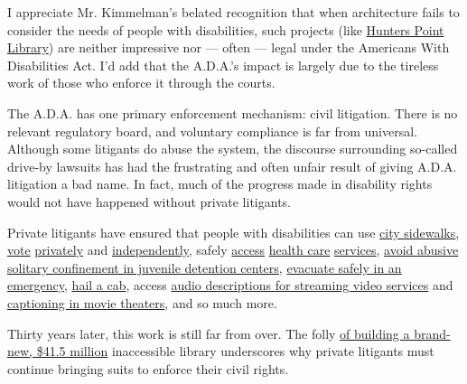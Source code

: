 I appreciate Mr. Kimmelman's belated recognition that when architecture
fails to consider the needs of people with disabilities, such projects
(like
\href{https://gothamist.com/news/new-41-million-hunters-point-library-has-one-major-flaw}{Hunters
Point Library}) are neither impressive nor --- often --- legal under the
Americans With Disabilities Act. I'd add that the A.D.A.'s impact is
largely due to the tireless work of those who enforce it through the
courts.

The A.D.A. has one primary enforcement mechanism: civil litigation.
There is no relevant regulatory board, and voluntary compliance is far
from universal. Although some litigants do abuse the system, the
discourse surrounding so-called drive-by lawsuits has had the
frustrating and often unfair result of giving A.D.A. litigation a bad
name. In fact, much of the progress made in disability rights would not
have happened without private litigants.

Private litigants have ensured that people with disabilities can use
\href{https://gothamist.com/news/nyc-agrees-to-make-all-sidewalk-curbs-accessible-to-the-disabled}{city
sidewalks},
\href{https://dralegal.org/case/eason-v-new-york-state-board-elections/}{vote}
\href{https://www.forbes.com/sites/peterslatin/2020/06/03/disabled-new-yorkers-can-vote--for-now/\#32c3ef4c5375}{privately}
and
\href{https://dralegal.org/press/landmark-decision-by-federal-appellate-court-vindicates-the-rights-of-voters-with-disabilities-in-new-york-city/}{independently},
safely \href{https://dralegal.org/case/metzler-v-kaiser/}{access}
\href{https://dralegal.org/case/sandra-lamb-v-nrad-medical-associates-et-al/}{health
care}
\href{https://dralegal.org/case/hinkle-et-al-v-kent-et-al/}{services},
\href{https://www.chicagotribune.com/la-me-ln-contra-costa-juvenile-education-20130808-story.html}{avoid
abusive solitary confinement in juvenile detention centers},
\href{https://www.nytimes3xbfgragh.onion/2013/11/08/nyregion/new-yorks-emergency-plans-violate-disabilities-act-judge-says.html}{evacuate
safely in an emergency},
\href{https://www.nytimes3xbfgragh.onion/2013/12/07/nyregion/wheelchair-settlement-poses-test-for-cab-industry.html}{hail
a cab}, access
\href{https://variety.com/2016/digital/news/netflix-audio-descriptions-blind-settlement-1201753569/}{audio
descriptions for streaming video services} and
\href{https://www.courthousenews.com/amc-movies-settles-class-action-blind/}{captioning
in movie theaters}, and so much more.

Thirty years later, this work is still far from over. The folly
\href{https://gothamist.com/news/lack-handicap-accessibility-flashy-new-hunters-point-library-sparks-lawsuit}{of
building a brand-new, \$41.5 million} inaccessible library underscores
why private litigants must continue bringing suits to enforce their
civil rights.

